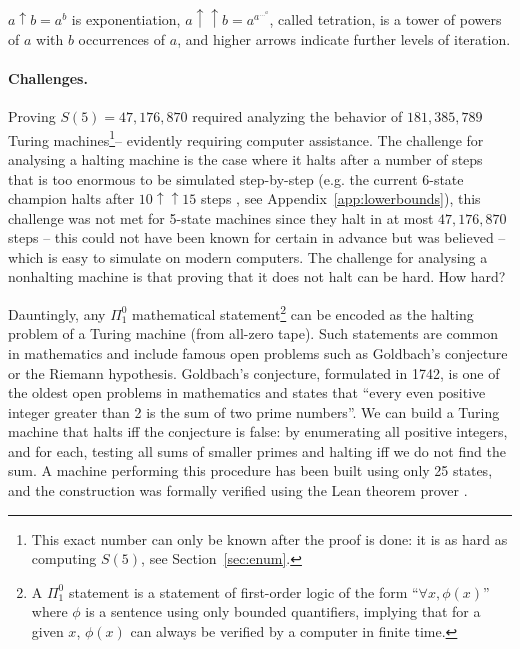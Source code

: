 \documentclass[a4paper,british]{article}
\theoremstyle{definition} %
\numberwithin{equation}{section}
\theoremstyle{definition} %
\newcommand{\BBtheFifth}{47{,}176{,}870}
\newcommand{\BBtheFifthTNF}{181{,}385{,}789}
\begin{document}
\begin{table}[h]
{        $a \uparrow b = a^b$ is exponentiation,
        $a \uparrow\uparrow b = a^{a^{\dots^a}}$, called tetration, is a tower of powers of $a$ with $b$ occurrences of $a$,
        and higher arrows indicate further levels of iteration.
    }
    \label{table:landscape}
\end{table}











\paragraph{Challenges.} Proving $S(5) = \BBtheFifth$ required analyzing the behavior of $\BBtheFifthTNF$ Turing machines\footnote{This exact number can only be known after the proof is done: it is as hard as computing $S(5)$, see Section~\ref{sec:enum}.}-- evidently requiring computer assistance. The challenge for analysing a halting machine is the case where it halts after a number of steps that is too enormous to be simulated step-by-step (e.g. the current 6-state champion halts after $10 \uparrow \uparrow 15$ steps \cite{Pavel_discorvery}, see Appendix~\ref{app:lowerbounds}), this challenge was not met for 5-state machines since they halt in at most $\BBtheFifth$ steps -- this could not have been known for certain in advance but was believed -- which is easy to simulate on modern computers. The challenge for analysing a nonhalting machine is that proving that it does not halt can be hard. How hard?

Dauntingly, any $\Pi_1^0$ mathematical statement\footnote{A $\Pi_1^0$ statement is a statement of first-order logic of the form ``$\forall x, \phi(x)$'' where $\phi$ is a sentence using only bounded quantifiers, implying that for a given $x$, $\phi(x)$ can always be verified by a computer in finite time.} can be encoded as the halting problem of a Turing machine (from all-zero tape). Such statements are common in mathematics and include famous open problems such as Goldbach's conjecture or the Riemann hypothesis. Goldbach's conjecture, formulated in 1742, is one of the oldest open problems in mathematics and states that ``every even positive integer greater than 2 is the sum of two prime numbers''. We can build a Turing machine that halts iff the conjecture is false: by enumerating all positive integers, and for each, testing all sums of smaller primes and halting iff we do not find the sum. A machine performing this procedure has been built using only 25 states, and the construction was formally verified using the Lean theorem prover \cite{GoldbachTM27, GoldbachTM25, DeMouraKongAvigadVanDoornvonRaumer}.
\end{document}
